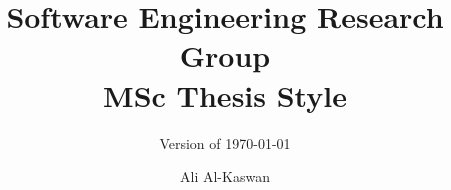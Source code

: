 \documentclass[twoside,a4paper,11pt]{memoir}
\title{Software Engineering Research Group \\MSc Thesis Style}
\subtitle{Version of \today}
\author{Ali Al-Kaswan}                               %
\begin{document}
\frontmatter
\thispagestyle{empty}
\maketitle                                      %



\cleardoublepage\tableofcontents
\cleardoublepage\listoffigures
\cleardoublepage\mainmatter













\appendix
\def\chaptername{Appendix}


\end{document}
